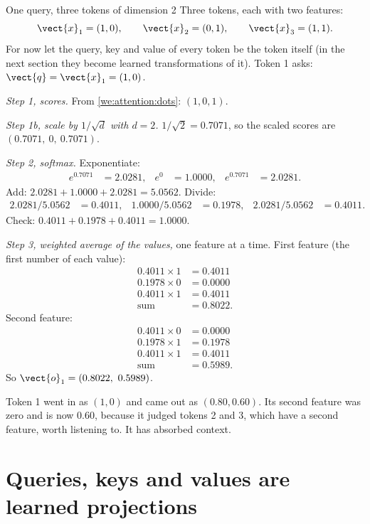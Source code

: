 \begin{worked}[label={we:attention:onequery}]{One query, three tokens of dimension 2}
Three tokens, each with two features:
\[
  \vect{x}_1 = (1, 0),\qquad \vect{x}_2 = (0, 1),\qquad \vect{x}_3 = (1, 1).
\]
For now let the query, key and value of every token be the token itself (in the next section
they become learned transformations of it). Token 1 asks: $\vect{q} = \vect{x}_1 = (1, 0)$.

\emph{Step 1, scores.} From \cref{we:attention:dots}: $(1, 0, 1)$.

\emph{Step 1b, scale by $1/\sqrt{d}$ with $d = 2$.} $1/\sqrt{2} = 0.7071$, so the scaled scores
are $(0.7071,\ 0,\ 0.7071)$.

\emph{Step 2, softmax.} Exponentiate:
\begin{align*}
  e^{0.7071} &= 2.0281, & e^{0} &= 1.0000, & e^{0.7071} &= 2.0281.
\end{align*}
Add: $2.0281 + 1.0000 + 2.0281 = 5.0562$. Divide:
\begin{align*}
  2.0281/5.0562 &= 0.4011, & 1.0000/5.0562 &= 0.1978, & 2.0281/5.0562 &= 0.4011.
\end{align*}
Check: $0.4011 + 0.1978 + 0.4011 = 1.0000$.

\emph{Step 3, weighted average of the values,} one feature at a time.
First feature (the first number of each value):
\begin{align*}
  0.4011\times 1 &= 0.4011\\
  0.1978\times 0 &= 0.0000\\
  0.4011\times 1 &= 0.4011\\
  \text{sum} &= 0.8022 .
\end{align*}
Second feature:
\begin{align*}
  0.4011\times 0 &= 0.0000\\
  0.1978\times 1 &= 0.1978\\
  0.4011\times 1 &= 0.4011\\
  \text{sum} &= 0.5989 .
\end{align*}
So $\vect{o}_1 = (0.8022,\ 0.5989)$.

Token 1 went in as $(1, 0)$ and came out as $(0.80, 0.60)$. Its second feature was zero and is
now 0.60, because it judged tokens 2 and 3, which have a second feature, worth listening to.
It has absorbed context.
\end{worked}

\section{Queries, keys and values are learned projections}\label{sec:attention:qkv}

